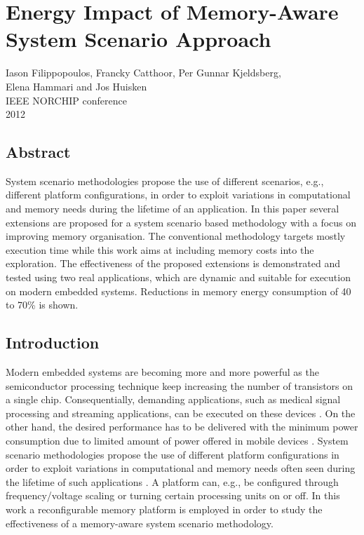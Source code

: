 \chapter{Energy Impact of Memory-Aware \\ System Scenario Approach}
\label{norchip}

\begin{center}
Iason Filippopoulos, Francky Catthoor, Per Gunnar Kjeldsberg, \\ Elena Hammari and Jos Huisken
\\
IEEE NORCHIP conference
\\
2012
\end{center}
\afterpage{\null\newpage}
\newpage

\vspace*{\fill}
\section*{\hspace*{\fill} Abstract \hspace*{\fill}}
System scenario methodologies propose the use of different scenarios, e.g., different platform configurations, in order to exploit variations in computational and memory needs during the lifetime of an application. In this paper several extensions are proposed for a system scenario based methodology with a focus on improving memory organisation. The conventional methodology targets mostly execution time while this work aims at including memory costs into the exploration. The effectiveness of the proposed extensions is demonstrated and tested using two real applications, which are dynamic and suitable for execution on modern embedded systems. Reductions in memory energy consumption of 40 to 70\% is shown.
\vspace*{\fill}
\afterpage{\null\newpage}
\newpage

\section{Introduction}
\label{sec:introduction}

Modern embedded systems are becoming more and more powerful as the semiconductor processing technique keep increasing the number of transistors on a single chip. Consequentially, demanding applications, such as medical signal processing and streaming applications, can be executed on these devices \cite{narasinga}. On the other hand, the desired performance has to be delivered with the minimum power consumption due to limited amount of power offered in mobile devices \cite{tcm}. System scenario methodologies propose the use of different platform configurations in order to exploit variations in computational and memory needs often seen during the lifetime of such applications \cite{tcm}. A platform can, e.g., be configured through frequency/voltage scaling or turning certain processing units on or off. In this work a reconfigurable memory platform is employed in order to study the effectiveness of a memory-aware system scenario methodology.


